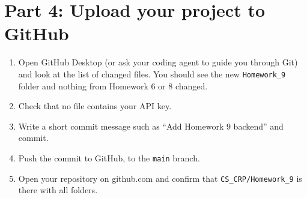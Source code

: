 \documentclass[11pt,a4paper]{article}
\begin{document}
\section{Part 4: Upload your project to GitHub}
\begin{enumerate}
\item Open GitHub Desktop (or ask your coding agent to guide you through Git) and look at the list of changed files. You should see the new \texttt{Homework\_9} folder and nothing from Homework 6 or 8 changed.
\item Check that no file contains your API key.
\item Write a short commit message such as ``Add Homework 9 backend'' and commit.
\item Push the commit to GitHub, to the \texttt{main} branch.
\item Open your repository on github.com and confirm that \texttt{CS\_CRP/Homework\_9} is there with all folders.
\end{enumerate}
\end{document}
